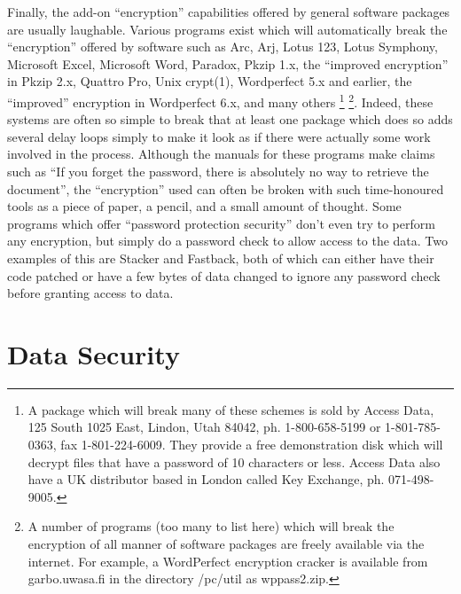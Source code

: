 Finally, the add-on ``encryption'' capabilities offered by general software
packages are usually laughable.  Various programs exist which will
automatically break the ``encryption'' offered by software such as Arc, Arj,
Lotus 123, Lotus Symphony, Microsoft Excel, Microsoft Word, Paradox, Pkzip 1.x,
the ``improved encryption'' in Pkzip 2.x, Quattro Pro, Unix crypt(1), Wordperfect
5.x and earlier, the ``improved'' encryption in Wordperfect 6.x, and many others
\footnote{
		A package which will break many of these schemes is sold by
              	Access Data, 125 South 1025 East, Lindon, Utah 84042, ph.
              	1-800-658-5199 or 1-801-785-0363, fax 1-801-224-6009.  They
              	provide a free demonstration disk which will decrypt files that
              	have a password of 10 characters or less.  Access Data also have
                a UK distributor based in London called Key Exchange, ph.
                071-498-9005.
} \footnote{
		A number of programs (too many to list here) which will break the
              	encryption of all manner of software packages are freely
              	available via the internet.  For example, a WordPerfect
              	encryption cracker is available from garbo.uwasa.fi in the
              	directory /pc/util as wppass2.zip.
}.
Indeed, these systems are often so simple to break that at least one package
which does so adds several delay loops simply to make it look as if there were
actually some work involved in the process. Although the manuals for these
programs make claims such as ``If you forget the password, there is absolutely
no way to retrieve the document'', the ``encryption'' used can often be broken
with such time-honoured tools as a piece of paper, a pencil, and a small amount
of thought.  Some programs which offer ``password protection security'' don't
even try to perform any encryption, but simply do a password check to allow
access to the data.  Two examples of this are Stacker and Fastback, both of
which can either have their code patched or have a few bytes of data changed to
ignore any password check before granting access to data.


\section{Data Security}

